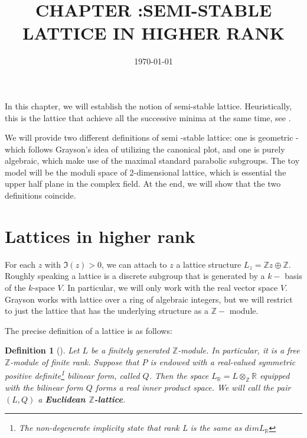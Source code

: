 \documentclass[12pt]{article} %
\title{CHAPTER  :SEMI-STABLE LATTICE IN HIGHER RANK} %
\date{\today} %
\newtheorem{definition}{Definition}[section]
\begin{document}
\maketitle %
In this chapter, we will establish the notion of semi-stable lattice. Heuristically,
this is the lattice that achieve all the successive minima at the same time, see \cite{}.

We will provide two different definitions of semi -stable lattice: one is geometric - which follows Grayson's idea of utilizing
the canonical plot, and one is purely algebraic, which make use of the maximal standard parabolic subgroups.
The toy model will be the moduli space of 2-dimensional lattice, which is essential the upper half plane in the complex field.
At the end, we will show that the two definitions coincide.
\section{Lattices in higher rank}
For each $z$ with $\Im(z)>0$, we can attach to $z$ a lattice structure $L_z = \mathbb{Z}z \oplus \mathbb{Z}$. Roughly speaking
a lattice is a discrete  subgroup that is generated by a $k-$ basis of the $k$-space $V$.
In particular, we will only work with the real vector space $V$. Grayson works with lattice over a ring of algebraic integers, but we will restrict to
just the lattice that has the underlying structure as a $\mathbb{Z}-$ module.


The precise definition
of a lattice is as follows:
\begin{definition}[\label = Euclidean $\mathbb{Z}$-lattices]
    Let $L$ be a finitely generated $\mathbb{Z}$-module. In particular, it is a free $\mathbb{Z}$-module
    of finite rank. Suppose that $P$ is endowed with a real-valued symmetric positive definite\footnote{The non-degenerate implicity state that rank L is the same as $dim L_\mathbb{R}$} bilinear form, called $Q$.
    Then the space $L_\mathbb{R}= L \otimes_\mathbb{Z} \mathbb{R}$ equipped with the bilinear form $Q$ forms a real
    inner product space. We will call  the pair $(L,Q)$ a \textbf{Euclidean $\mathbb{Z}$-lattice}.
\end{definition}
\end{document}

